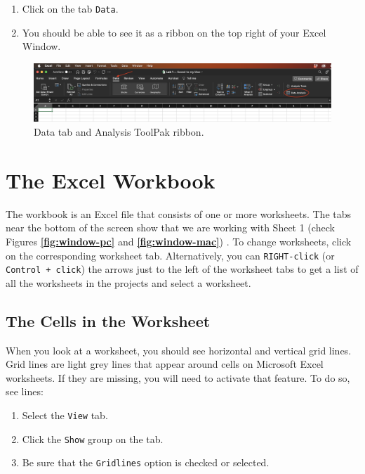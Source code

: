 \documentclass[
]{book}
\providecommand{\tightlist}{%
  \setlength{\itemsep}{0pt}\setlength{\parskip}{0pt}}
\begin{document}
\begin{enumerate}
\def\labelenumi{\arabic{enumi}.}
\tightlist
\item
  Click on the tab \texttt{Data}.
\item
  You should be able to see it as a ribbon on the top right of your Excel Window.
\end{enumerate}

\begin{figure}

{\centering \includegraphics[width=0.9\linewidth]{images/check_toolpak_mac} 

}

\caption{Data tab and Analysis ToolPak ribbon.}\label{fig:check-toolpak-mac}
\end{figure}

\hypertarget{workbook}{%
\section{The Excel Workbook}\label{workbook}}

The workbook is an Excel file that consists of one or more worksheets. The tabs near the bottom of the screen show that we are working with Sheet 1 (check Figures \textbf{\ref{fig:window-pc}} and \textbf{\ref{fig:window-mac}}) . To change worksheets, click on the corresponding worksheet tab. Alternatively, you can \texttt{RIGHT-click} (or \texttt{Control\ +\ click}) the arrows just to the left of the worksheet tabs to get a list of all the worksheets in the projects and select a worksheet.

\hypertarget{the-cells-in-the-worksheet}{%
\subsection{The Cells in the Worksheet}\label{the-cells-in-the-worksheet}}

When you look at a worksheet, you should see horizontal and vertical grid lines. Grid lines are light grey lines that appear around cells on Microsoft Excel worksheets. If they are missing, you will need to activate that feature. To do so, see lines:

\begin{enumerate}
\def\labelenumi{\arabic{enumi}.}
\tightlist
\item
  Select the \texttt{View} tab.
\item
  Click the \texttt{Show} group on the tab.
\item
  Be sure that the \texttt{Gridlines} option is checked or selected.
\end{enumerate}
\end{document}
